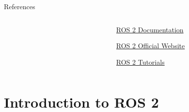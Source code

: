 \begin{frame}{References}
\begin{columns}[c]
\begin{column}{.45\textwidth}
\begin{figure}
            \end{figure}
        \end{column}
        \begin{column}{.45\textwidth}
            \centering
            \small
            \href{https://docs.ros.org/en/humble/}{ROS 2 Documentation}

            \vspace{0.3cm}

            \href{https://www.ros.org/}{ROS 2 Official Website}

            \vspace{0.3cm}

            \href{https://github.com/ros2/ros2_documentation}{ROS 2 Tutorials}
        \end{column}
    \end{columns}
\end{frame}

\section{Introduction to ROS 2}

